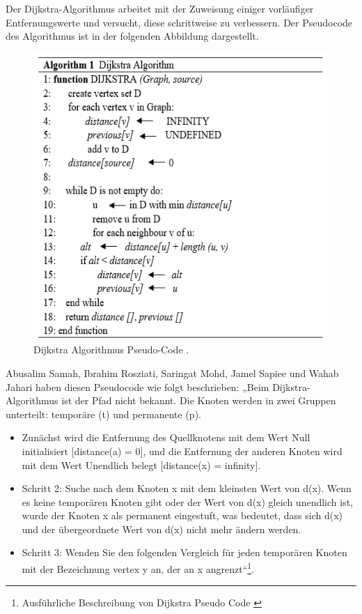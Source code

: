 Der Dijkstra-Algorithmus arbeitet mit der Zuweisung einiger vorläufiger Entfernungswerte und versucht, diese schrittweise zu verbessern. Der Pseudocode des Algorithmus ist in der folgenden Abbildung dargestellt\cite{Huang2012}.
 \begin{figure}[H]
	\centering
	\includegraphics[width=1.0\textwidth]{images/Dijkstra_pseudoCode.PNG}
	\caption{\label{fig:Dijkstra}Dijkstra Algorithmus Pseudo-Code \cite{Abusalim2020}.}
\end{figure}

Abusalim Samah, Ibrahim Rosziati, Saringat Mohd, Jamel Sapiee und Wahab Jahari haben  diesen Pseudocode wie folgt beschrieben:
\newline
\newline
 „Beim Dijkstra-Algorithmus ist der Pfad nicht bekannt. Die Knoten werden in zwei Gruppen unterteilt: temporäre (t) und permanente (p).
\begin{itemize}
	\item  Zunächst wird die Entfernung des Quellknotens mit dem Wert Null initialisiert [distance(a) = 0], und die Entfernung der anderen Knoten wird mit dem Wert Unendlich belegt [distance(x) = infinity]. 
	\item Schritt 2: Suche nach dem Knoten x mit dem kleinsten Wert von d(x). Wenn es keine temporären Knoten gibt oder der Wert von d(x) gleich unendlich ist, wurde der Knoten x als permanent eingestuft, was bedeutet, dass sich d(x) und der übergeordnete Wert von d(x) nicht mehr ändern werden. 
	\item Schritt 3: Wenden Sie den folgenden Vergleich für jeden temporären Knoten mit der Bezeichnung vertex y an, der an x angrenzt“\footnote{Ausführliche Beschreibung von Dijkstra Pseudo Code \cite{Abusalim2020}}.
\end{itemize}


